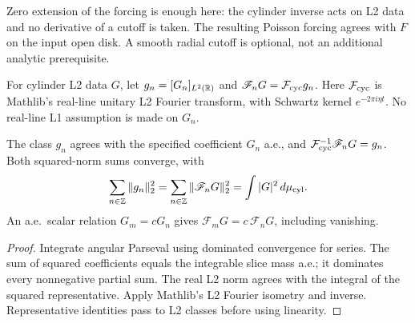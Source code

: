 \begin{remark}
Zero extension of the forcing is enough here: the cylinder inverse acts on
L2 data and no derivative of a cutoff is taken. The resulting Poisson forcing
agrees with $F$ on the input open disk. A smooth radial cutoff is optional,
not an additional analytic prerequisite.
\end{remark}

\begin{definition}
\label{def:cylinder-fourier-modes}
\leanok
For cylinder L2 data $G$, let $g_n=[G_n]_{L^2(\mathbb{R})}$ and
$\mathscr F_nG=\mathcal F_{\rm cyc}g_n$.
Here $\mathcal F_{\rm cyc}$ is Mathlib's real-line unitary L2 Fourier transform,
with Schwartz kernel $e^{-2\pi i\eta t}$.
No real-line L1 assumption is made on $G_n$.
\end{definition}

\begin{lemma}
\label{lem:cylinder-fourier-modes}
\leanok
The class $g_n$ agrees with the specified coefficient $G_n$ a.e., and
$\mathcal F_{\rm cyc}^{-1}\mathscr F_nG=g_n$.
Both squared-norm sums converge, with
\[
 \sum_{n\in\mathbb{Z}}\|g_n\|_2^2
 =\sum_{n\in\mathbb{Z}}\|\mathscr F_nG\|_2^2
 =\int |G|^2\,d\mu_{\rm cyl}.
\]
An a.e.\ scalar relation $G_m=cG_n$ gives
$\mathscr F_mG=c\,\mathscr F_nG$, including vanishing.
\end{lemma}

\begin{proof}
\leanok
Integrate angular Parseval using dominated convergence for series.
The sum of squared coefficients equals the integrable slice mass a.e.;
it dominates every nonnegative partial sum.
The real L2 norm agrees with the integral of the squared representative.
Apply Mathlib's L2 Fourier isometry and inverse.
Representative identities pass to L2 classes before using linearity.
\end{proof}

